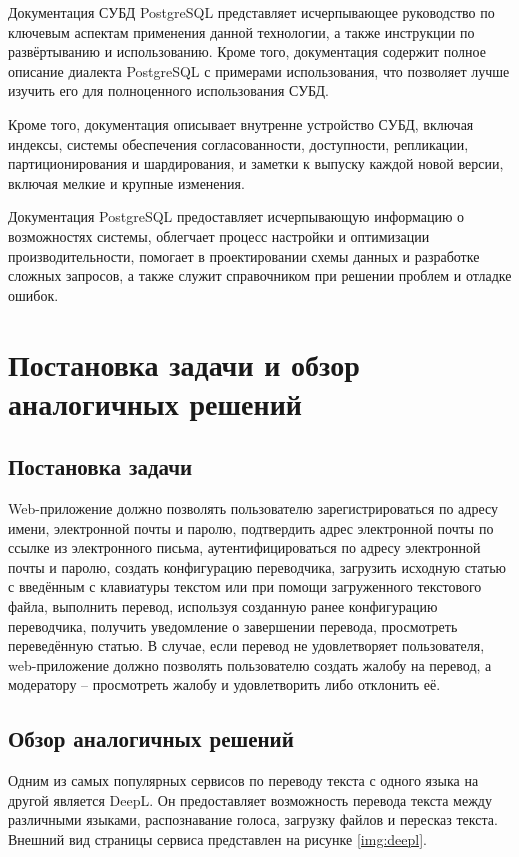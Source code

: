 \documentclass[14pt]{extarticle}
\begin{document}
Документация СУБД PostgreSQL представляет исчерпывающее руководство по ключевым аспектам применения данной технологии, а также инструкции по развёртыванию и использованию. Кроме того, документация содержит полное описание диалекта PostgreSQL с примерами использования, что позволяет лучше изучить его для полноценного использования СУБД.

Кроме того, документация описывает внутренне устройство СУБД, включая индексы, системы обеспечения согласованности, доступности, репликации, партиционирования и шардирования, и заметки к выпуску каждой новой версии, включая мелкие и крупные изменения.

Документация PostgreSQL предоставляет исчерпывающую информацию о возможностях системы, облегчает процесс настройки и оптимизации производительности, помогает в проектировании схемы данных и разработке сложных запросов, а также служит справочником при решении проблем и отладке ошибок.



\clearpage
\section{Постановка задачи и обзор аналогичных решений}
\subsection{Постановка задачи}

Web-приложение должно позволять пользователю зарегистрироваться по адресу имени, электронной почты и паролю, подтвердить адрес электронной почты по ссылке из электронного письма, аутентифицироваться по адресу электронной почты и паролю, создать конфигурацию переводчика, загрузить исходную статью с введённым с клавиатуры текстом или при помощи загруженного текстового файла, выполнить перевод, используя созданную ранее конфигурацию переводчика, получить уведомление о завершении перевода, просмотреть переведённую статью. В случае, если перевод не удовлетворяет пользователя, web-приложение должно позволять пользователю создать жалобу на перевод, а модератору – просмотреть жалобу и удовлетворить либо отклонить её.

\subsection{Обзор аналогичных решений}


Одним из самых популярных сервисов по переводу текста с одного языка на другой является DeepL. Он предоставляет возможность перевода текста между различными языками, распознавание голоса, загрузку файлов и пересказ текста. Внешний вид страницы сервиса представлен на рисунке \ref{img:deepl}.
\end{document}
